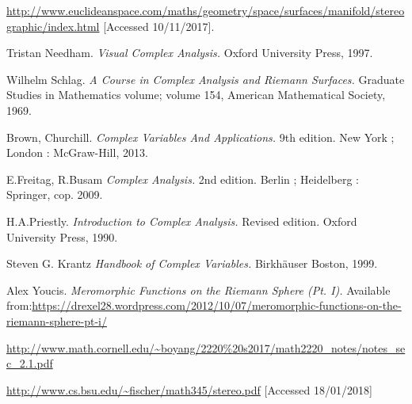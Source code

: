 \documentclass{article}
\begin{document}
\begin{thebibliography}{}
\url{http://www.euclideanspace.com/maths/geometry/space/surfaces/manifold/stereographic/index.html} [Accessed 10/11/2017].
 
 Tristan Needham.
 \textit{Visual Complex Analysis.}
 Oxford University Press, 1997.
 
 Wilhelm Schlag.
 \textit{A Course in Complex Analysis and Riemann Surfaces.}
 Graduate Studies in Mathematics volume; volume 154, American Mathematical Society, 1969.
 
 Brown, Churchill.
 \textit{Complex Variables And Applications.}
 9th edition.
 New York ; London : McGraw-Hill, 2013.
 
 E.Freitag, R.Busam
 \textit{Complex Analysis.}
 2nd edition.
 Berlin ; Heidelberg : Springer, cop. 2009.
 
 H.A.Priestly.
 \textit{Introduction to Complex Analysis.}
 Revised edition.
 Oxford University Press,
 1990.
 
 Steven G. Krantz
 \textit{Handbook of Complex Variables.}
 Birkh\"auser Boston, 1999.
 
 Alex Youcis.
\textit{Meromorphic Functions on the Riemann Sphere (Pt. I).}
Available from:\url{https://drexel28.wordpress.com/2012/10/07/meromorphic-functions-on-the-riemann-sphere-pt-i/} \newline [Accessed 20/01/2018]

\url{http://www.math.cornell.edu/~boyang/2220\%20s2017/math2220_notes/notes_sec_2.1.pdf} \newline [Accessed 18/01/2018]

\url{http://www.cs.bsu.edu/~fischer/math345/stereo.pdf} [Accessed 18/01/2018]

\end{thebibliography}
\end{document}
